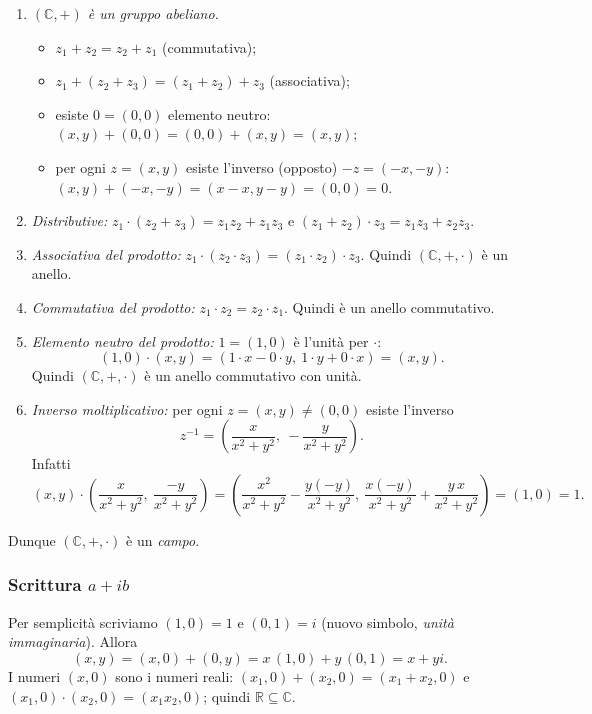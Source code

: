 \documentclass[11pt,a4paper]{article}
\begin{document}
\begin{enumerate}
  \item \emph{$(\mathbb{C}, +)$ è un gruppo abeliano.}
  \begin{itemize}
    \item $z_1 + z_2 = z_2 + z_1$ (commutativa);
    \item $z_1 + (z_2 + z_3) = (z_1 + z_2) + z_3$ (associativa);
    \item esiste $0 = (0, 0)$ elemento neutro: $(x, y) + (0, 0) = (0, 0) + (x, y) = (x, y)$;
    \item per ogni $z = (x, y)$ esiste l'inverso (opposto) $-z = (-x, -y)$: $(x, y) + (-x, -y) = (x - x, y - y) = (0, 0) = 0$.
  \end{itemize}
  \item \emph{Distributive:} $z_1\cdot(z_2 + z_3) = z_1 z_2 + z_1 z_3$ e $(z_1 + z_2)\cdot z_3 = z_1 z_3 + z_2 z_3$.
  \item \emph{Associativa del prodotto:} $z_1\cdot(z_2\cdot z_3) = (z_1\cdot z_2)\cdot z_3$. Quindi $(\mathbb{C}, +, \cdot)$ è un anello.
  \item \emph{Commutativa del prodotto:} $z_1 \cdot z_2 = z_2 \cdot z_1$. Quindi è un anello commutativo.
  \item \emph{Elemento neutro del prodotto:} $1 = (1, 0)$ è l'unità per $\cdot$:
  \[
    (1, 0)\cdot(x, y) = (1\cdot x - 0\cdot y,\ 1\cdot y + 0\cdot x) = (x, y).
  \]
  Quindi $(\mathbb{C}, +, \cdot)$ è un anello commutativo con unità.
  \item \emph{Inverso moltiplicativo:} per ogni $z = (x, y) \neq (0, 0)$ esiste l'inverso
  \[
    z^{-1} = \left( \frac{x}{x^2 + y^2},\ -\frac{y}{x^2 + y^2} \right).
  \]
  Infatti
  \[
    (x, y)\cdot\left( \frac{x}{x^2+y^2},\ \frac{-y}{x^2+y^2} \right)
    = \left( \frac{x^2}{x^2+y^2} - \frac{y(-y)}{x^2+y^2},\ \frac{x(-y)}{x^2+y^2} + \frac{y\,x}{x^2+y^2} \right) = (1, 0) = 1 .
  \]
\end{enumerate}
Dunque $(\mathbb{C}, +, \cdot)$ è un \emph{campo}.

\subsubsection{Scrittura $a + ib$}

Per semplicità scriviamo $(1, 0) = 1$ e $(0, 1) = i$ (nuovo simbolo, \emph{unità immaginaria}). Allora
\[
  (x, y) = (x, 0) + (0, y) = x\,(1, 0) + y\,(0, 1) = x + yi .
\]
I numeri $(x, 0)$ sono i numeri reali: $(x_1, 0) + (x_2, 0) = (x_1 + x_2, 0)$ e $(x_1, 0)\cdot(x_2, 0) = (x_1 x_2, 0)$; quindi $\mathbb{R} \subseteq \mathbb{C}$.
\end{document}
